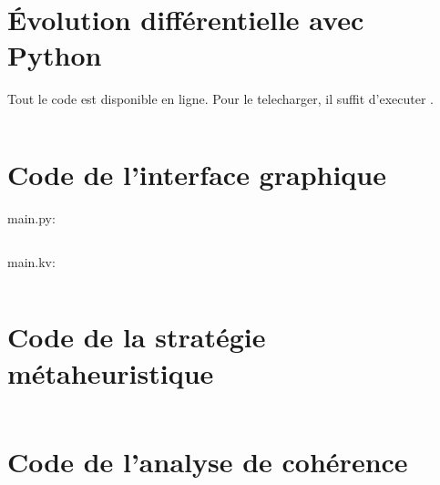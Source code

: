 \begin{appendices}
  
\chapter{Évolution différentielle avec Python}
\scriptsize   Tout le code est disponible en ligne. Pour le telecharger, il suffit d'executer .
  \inputminted[mathescape,
               linenos,
               numbersep=5pt,
               frame=lines,
               framesep=2mm,
               breaklines=true,
               fontsize=\scriptsize]{Python}{/home/youssef/PycharmProjects/DEPV/objects.py}
               
\chapter{Code de l'interface graphique}
    main.py:
    \inputminted[mathescape,
               linenos,
               numbersep=5pt,
               frame=lines,
               framesep=2mm,
               breaklines=true,
               fontsize=\scriptsize]{Python}{/home/youssef/PycharmProjects/DEPV/main.py}
    main.kv:
    \inputminted[mathescape,
               linenos,
               numbersep=5pt,
               frame=lines,
               framesep=2mm,
               breaklines=true,
               fontsize=\scriptsize]{Python}{/home/youssef/PycharmProjects/DEPV/main.kv}
  
\chapter{Code de la stratégie métaheuristique}
  
    \inputminted[mathescape,
               linenos,
               numbersep=5pt,
               frame=lines,
               framesep=2mm,
               breaklines=true,
               fontsize=\scriptsize]{Python}{/home/youssef/PycharmProjects/DEPV/metaheuristic.py}
               
\chapter{Code de l'analyse de cohérence}
\inputminted[mathescape,
               linenos,
               numbersep=5pt,
               frame=lines,
               framesep=2mm,
               breaklines=true,
               fontsize=\scriptsize]{Python}{/home/youssef/PycharmProjects/DEPV/consistency.py}
\inputminted[mathescape,
               linenos,
               numbersep=5pt,
               frame=lines,
               framesep=2mm,
               breaklines=true,
               fontsize=\scriptsize]{Python}{/home/youssef/PycharmProjects/DEPV/metaconsistency.py}
               

\end{appendices}
